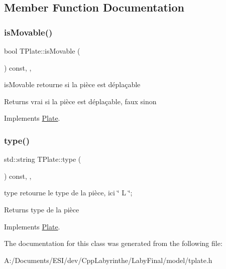 \subsection{Member Function Documentation}
\mbox{\label{class_t_plate_acaf65b2b9749bc78cfc9e2d2af4ea6b8}} 
\subsubsection{\texorpdfstring{isMovable()}{isMovable()}}
{\footnotesize\ttfamily bool T\+Plate\+::is\+Movable (\begin{DoxyParamCaption}{ }\end{DoxyParamCaption}) const\hspace{0.3cm}{\ttfamily [inline]}, {\ttfamily [override]}, {\ttfamily [virtual]}}



is\+Movable retourne si la pièce est déplaçable 

\begin{DoxyReturn}{Returns}
vrai si la pièce est déplaçable, faux sinon 
\end{DoxyReturn}


Implements \mbox{\hyperlink{class_plate}{Plate}}.

\mbox{\label{class_t_plate_a321915f8a44ec086cca992c543b0bfc9}} 
\subsubsection{\texorpdfstring{type()}{type()}}
{\footnotesize\ttfamily std\+::string T\+Plate\+::type (\begin{DoxyParamCaption}{ }\end{DoxyParamCaption}) const\hspace{0.3cm}{\ttfamily [inline]}, {\ttfamily [override]}, {\ttfamily [virtual]}}



type retourne le type de la pièce, ici \char`\"{} L \char`\"{}; 

\begin{DoxyReturn}{Returns}
type de la pièce 
\end{DoxyReturn}


Implements \mbox{\hyperlink{class_plate}{Plate}}.



The documentation for this class was generated from the following file\+:\begin{DoxyCompactItemize}
\item 
A\+:/\+Documents/\+E\+S\+I/dev/\+Cpp\+Labyrinthe/\+Laby\+Final/model/tplate.\+h\end{DoxyCompactItemize}
